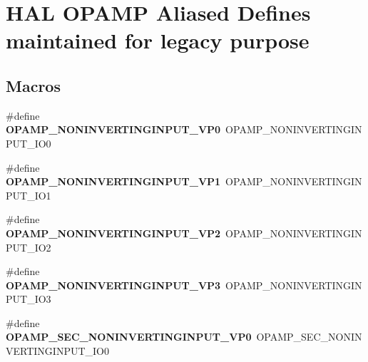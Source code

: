 \hypertarget{group___h_a_l___o_p_a_m_p___aliased___defines}{\section{H\-A\-L O\-P\-A\-M\-P Aliased Defines maintained for legacy purpose}
\label{group___h_a_l___o_p_a_m_p___aliased___defines}
}
\subsection*{Macros}
\begin{DoxyCompactItemize}
\item 
\hypertarget{group___h_a_l___o_p_a_m_p___aliased___defines_ga0c8a66d4ef4f3e5ddff93741d59730a9}{\#define {\bfseries O\-P\-A\-M\-P\-\_\-\-N\-O\-N\-I\-N\-V\-E\-R\-T\-I\-N\-G\-I\-N\-P\-U\-T\-\_\-\-V\-P0}~O\-P\-A\-M\-P\-\_\-\-N\-O\-N\-I\-N\-V\-E\-R\-T\-I\-N\-G\-I\-N\-P\-U\-T\-\_\-\-I\-O0}\label{group___h_a_l___o_p_a_m_p___aliased___defines_ga0c8a66d4ef4f3e5ddff93741d59730a9}

\item 
\hypertarget{group___h_a_l___o_p_a_m_p___aliased___defines_ga2373d73432511331d18e850f2cbcb637}{\#define {\bfseries O\-P\-A\-M\-P\-\_\-\-N\-O\-N\-I\-N\-V\-E\-R\-T\-I\-N\-G\-I\-N\-P\-U\-T\-\_\-\-V\-P1}~O\-P\-A\-M\-P\-\_\-\-N\-O\-N\-I\-N\-V\-E\-R\-T\-I\-N\-G\-I\-N\-P\-U\-T\-\_\-\-I\-O1}\label{group___h_a_l___o_p_a_m_p___aliased___defines_ga2373d73432511331d18e850f2cbcb637}

\item 
\hypertarget{group___h_a_l___o_p_a_m_p___aliased___defines_gaefe0c48289b99fc2a72078562ab1bbce}{\#define {\bfseries O\-P\-A\-M\-P\-\_\-\-N\-O\-N\-I\-N\-V\-E\-R\-T\-I\-N\-G\-I\-N\-P\-U\-T\-\_\-\-V\-P2}~O\-P\-A\-M\-P\-\_\-\-N\-O\-N\-I\-N\-V\-E\-R\-T\-I\-N\-G\-I\-N\-P\-U\-T\-\_\-\-I\-O2}\label{group___h_a_l___o_p_a_m_p___aliased___defines_gaefe0c48289b99fc2a72078562ab1bbce}

\item 
\hypertarget{group___h_a_l___o_p_a_m_p___aliased___defines_ga45a66909e6190a2cef2b6cb1a623ef3e}{\#define {\bfseries O\-P\-A\-M\-P\-\_\-\-N\-O\-N\-I\-N\-V\-E\-R\-T\-I\-N\-G\-I\-N\-P\-U\-T\-\_\-\-V\-P3}~O\-P\-A\-M\-P\-\_\-\-N\-O\-N\-I\-N\-V\-E\-R\-T\-I\-N\-G\-I\-N\-P\-U\-T\-\_\-\-I\-O3}\label{group___h_a_l___o_p_a_m_p___aliased___defines_ga45a66909e6190a2cef2b6cb1a623ef3e}

\item 
\hypertarget{group___h_a_l___o_p_a_m_p___aliased___defines_ga0ca7da83e2be923743de9b1fa58e0b01}{\#define {\bfseries O\-P\-A\-M\-P\-\_\-\-S\-E\-C\-\_\-\-N\-O\-N\-I\-N\-V\-E\-R\-T\-I\-N\-G\-I\-N\-P\-U\-T\-\_\-\-V\-P0}~O\-P\-A\-M\-P\-\_\-\-S\-E\-C\-\_\-\-N\-O\-N\-I\-N\-V\-E\-R\-T\-I\-N\-G\-I\-N\-P\-U\-T\-\_\-\-I\-O0}\label{group___h_a_l___o_p_a_m_p___aliased___defines_ga0ca7da83e2be923743de9b1fa58e0b01}


\end{DoxyCompactItemize}
